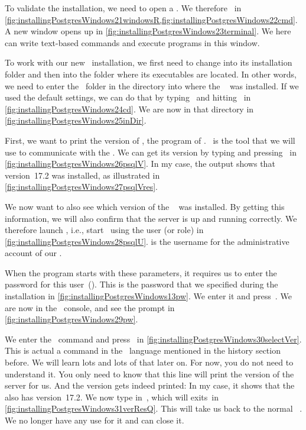 To validate the installation, we need to open a .
We therefore \windowsTerminal\ in \cref{fig:installingPostgresWindows21windowsR,fig:installingPostgresWindows22cmd}.
A new  window opens up in \cref{fig:installingPostgresWindows23terminal}.
We here can write text-based commands and execute programs in this window.

To work with our new \postgresql\ installation, we first need to change into its installation folder and then into the folder where its executables are located.
In other words, we need to enter the ~folder in the directory into where the \postgresql\  was installed.
If we used the default settings, we can do that by typing~ and hitting~\keys{\enter} in \cref{fig:installingPostgresWindows24cd}.
We are now in that directory in \cref{fig:installingPostgresWindows25inDir}.

First, we want to print the version of \psql, the  program of \postgresql.
\psql\ is the tool that we will use to communicate with the .
We can get its version by typing  and pressing~\keys{\enter} in \cref{fig:installingPostgresWindows26psqlV}.
In my case, the output shows that version~17.2 was installed, as illustrated in \cref{fig:installingPostgresWindows27psqlVres}.

We now want to also see which version of the \postgresql\  was installed.
By getting this information, we will also confirm that the server is up and running correctly.
We therefore launch , i.e., start \psql\ using the user (or role)  in \cref{fig:installingPostgresWindows28psqlU}.
 is the username for the administrative account of our .

When the program starts with these parameters, it requires us to enter the password for this user~().
This is the password that we specified during the installation in \cref{fig:installingPostgresWindows13pw}.
We enter it and press~\keys{\enter}.
We are now in the \psql\ console, and see the  prompt in \cref{fig:installingPostgresWindows29pw}.

We enter the \sql\ command  and press~\keys{\enter} in \cref{fig:installingPostgresWindows30selectVer}.
This is actual a command in the \sql\ language mentioned in the history section before.
We will learn lots and lots of that later on.
For now, you do not need to understand it.
You only need to know that this line will print the version of the server for us.
And the version gets indeed printed:
In my case, it shows that the \postgresql\  also has version~17.2.
We now type in~, which will exits~\psql in \cref{fig:installingPostgresWindows31verResQ}.
This will take us back to the normal \windows\ .
We no longer have any use for it and can close it.

